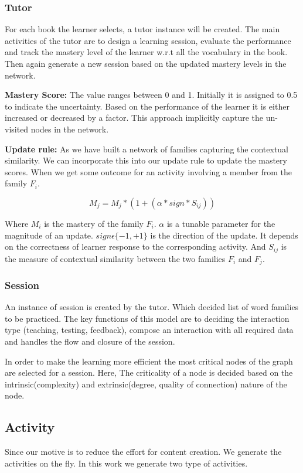 \documentclass[11pt,a4paper]{article}
\begin{document}
\subsubsection{Tutor}
For each book the learner selects, a tutor instance will be created. The main
activities of the tutor are to design a learning session, evaluate the
performance and track the mastery level of the learner w.r.t all the vocabulary
in the book. Then again generate a new session based on the updated mastery
levels in the network.

\textbf{Mastery Score:} The value ranges between 0 and 1. Initially it is
assigned to 0.5 to indicate the uncertainty. Based on the performance of the
learner it is either increased or decreased by a factor. This approach implicitly
capture the un-visited nodes in the network.

\textbf{Update rule:} As we have built a network of families capturing the
contextual similarity. We can incorporate this into our update rule to update
the mastery scores. When we get some outcome for an activity involving a member
from the family ${F_i}$.

\begin{equation}
  M_j = M_j * (1 + (\alpha * sign * S_{ij}))
\end{equation}

Where ${M_i}$ is the mastery of the family ${F_i}$. ${\alpha}$ is a tunable parameter
for the magnitude of an update. ${sign \epsilon \{-1, +1\}}$ is the direction 
of the update. It depends on the correctness of learner response to the corresponding
activity. And ${S_{ij}}$ is the measure of contextual similarity between the two
families ${F_i}$ and ${F_j}$.

\subsubsection{Session}
An instance of session is created by the tutor. Which decided list of word
families to be practiced. The key functions of this model are to deciding the
interaction type (teaching, testing, feedback), compose an interaction with all
required data and handles the flow and closure of the session.

In order to make the learning more efficient the most critical nodes of the
graph are selected for a session. Here, The criticality of a node is decided
based on the intrinsic(complexity) and extrinsic(degree, quality of connection)
nature of the node.


\subsection{Activity}
Since our motive is to reduce the effort for content creation. We generate the
activities on the fly. In this work we generate two type of activities. 
\end{document}
